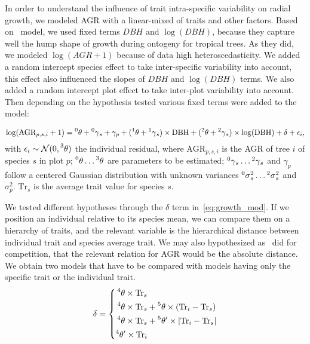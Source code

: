 In order to understand the influence of trait intra-specific variability on radial growth, we modeled AGR with a linear-mixed of traits and other factors. Based on~\citet{herault_functional_2011} model, we used fixed terms $DBH$ and $\log(DBH)$, because they capture well the hump shape of growth during ontogeny for tropical trees. As they did, we modeled $\log(AGR + 1)$ because of data high heteroscedasticity. We added a random intercept species effect to take inter-specific variability into account, this effect also influenced the slopes of $DBH$ and $\log(DBH)$ terms. We also added a random intercept plot effect to take inter-plot variability into account. Then depending on the hypothesis tested various fixed terms were added to the model:

\begin{equation}
	\label{eq:growth_mod}
	\log(\text{AGR}_{p, s, i} + 1) = \prescript{0}{}\theta + \prescript{0}{}\gamma_s + \gamma_p
		+ (\prescript{1}{}\theta + \prescript{1}{}\gamma_s) \times \text{DBH}
		+ (\prescript{2}{}\theta + \prescript{2}{}\gamma_s) \times \log(\text{DBH})
		+ \delta
		+ \epsilon_i,
\end{equation}
with $\epsilon_i \sim \mathcal{N}(0, \prescript{3}{}\theta)$ the individual residual,
where $\text{AGR}_{p, s, i}$ is the AGR of tree $i$ of species $s$ in plot $p$; $\prescript{0}{}\theta \dots \prescript{3}{}\theta$ are parameters to be estimated; $\prescript{0}{}\gamma_{s} \dots \prescript{2}{}\gamma_s$ and $\gamma_p$ follow a centered Gaussian distribution with unknown variances $\prescript{0}{}\sigma^2_s \dots \prescript{2}{}\sigma^2_s$ and $\sigma^2_p$. $\text{Tr}_s$ is the average trait value for species $s$.

We tested different hypotheses through the $\delta$ term in~\autoref{eq:growth_mod}. If we position an individual relative to its species mean, we can compare them on a hierarchy of traits, and the relevant variable is the hierarchical distance between individual trait and species average trait. We may also hypothesized as~\citet{kunstler_competitive_2012} did for competition, that the relevant relation for AGR would be the absolute distance. We obtain two models that have to be compared with models having only the specific trait or the individual trait.
\begin{equation}
\label{eq:delta}
\delta = \left\{
	\begin{aligned}
		\prescript{4}{}\theta\times \text{Tr}_s & \\
		\prescript{4}{}\theta \times \text{Tr}_s & + \prescript{5}{}\theta \times(\text{Tr}_i - \text{Tr}_s) \\
		\prescript{4}{}\theta \times \text{Tr}_s & + \prescript{5}{}\theta' \times \vert \text{Tr}_i - \text{Tr}_s \vert \\
		\prescript{4}{}\theta' \times \text{Tr}_i& \\
	\end{aligned}
\right.
\end{equation}


